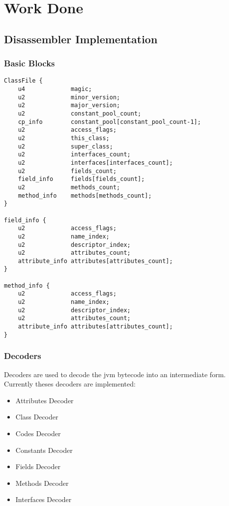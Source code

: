 \chapter{Work Done}

\section{Disassembler Implementation}

\subsection{Basic Blocks}

\begin{lstlisting}
ClassFile {
    u4             magic;
    u2             minor_version;
    u2             major_version;
    u2             constant_pool_count;
    cp_info        constant_pool[constant_pool_count-1];
    u2             access_flags;
    u2             this_class;
    u2             super_class;
    u2             interfaces_count;
    u2             interfaces[interfaces_count];
    u2             fields_count;
    field_info     fields[fields_count];
    u2             methods_count;
    method_info    methods[methods_count];
}

field_info {
    u2             access_flags;
    u2             name_index;
    u2             descriptor_index;
    u2             attributes_count;
    attribute_info attributes[attributes_count];
}

method_info {
    u2             access_flags;
    u2             name_index;
    u2             descriptor_index;
    u2             attributes_count;
    attribute_info attributes[attributes_count];
}
\end{lstlisting}

\subsection{Decoders}
Decoders are used to decode the jvm bytecode into an intermediate form. Currently theses decoders are implemented:

\begin{itemize}
	\itemsep-0.3em 
	\item Attributes Decoder
	\item Class Decoder
	\item Codes Decoder
	\item Constants Decoder
	\item Fields Decoder
	\item Methods Decoder
	\item Interfaces Decoder
\end{itemize}

